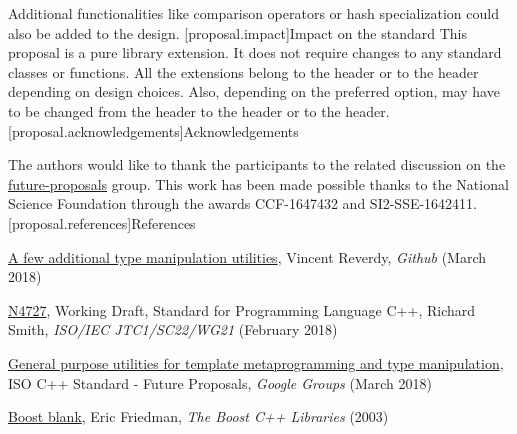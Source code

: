 \documentclass[ebook,10pt,oneside,openany,final]{memoir}
\begin{document}
Additional functionalities like comparison operators or hash specialization could also be added to the design.
[proposal.impact]{Impact on the standard}
This proposal is a pure library extension. It does not require changes to any standard classes or functions. All the extensions belong to the  header or to the  header depending on design choices. Also, depending on the preferred option,  may have to be changed from the  header to the  header or to the  header.
[proposal.acknowledgements]{Acknowledgements}

The authors would like to thank the participants to the related discussion on the \href{https://groups.google.com/a/isocpp.org/forum/#!topic/std-proposals/R04CWOjABIQ}{future-proposals} group. This work has been made possible thanks to the National Science Foundation through the awards CCF-1647432 and SI2-SSE-1642411.
[proposal.references]{References}

\href{https://github.com/vreverdy/type-utilities}{A few additional type manipulation utilities}, Vincent Reverdy, \emph{Github} (March 2018)

\href{http://www.open-std.org/jtc1/sc22/wg21/docs/papers/2018/n4727.pdf}{N4727}, Working Draft, Standard for Programming Language C++, Richard Smith, \emph{ISO/IEC JTC1/SC22/WG21} (February 2018)

\href{https://groups.google.com/a/isocpp.org/forum/#!topic/std-proposals/R04CWOjABIQ}{General purpose utilities for template metaprogramming and type manipulation}, ISO C++ Standard - Future Proposals, \emph{Google Groups} (March 2018)

\href{https://www.boost.org/doc/libs/1_66_0/boost/blank.hpp}{Boost blank}, Eric Friedman, \emph{The Boost C++ Libraries} (2003)
\newpage
{}
\setcounter{chapter}{2}

\backmatter
\end{document}
